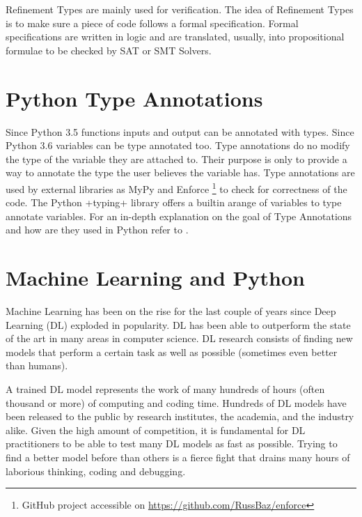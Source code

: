 Refinement Types \autocite{rushby_subtypes_1998} are mainly used for
verification. The idea of Refinement Types is to make sure a piece of
code follows a formal specification. Formal specifications are written
in logic and are translated, usually, into propositional formulae to be
checked by SAT or SMT Solvers.

\section{Python Type Annotations}\label{python-type-annotations}

Since Python 3.5 \autocite{pep484} functions inputs and output can be
annotated with types. Since Python 3.6 \autocite{pep526} variables can
be type annotated too. Type annotations do no modify the type of the
variable they are attached to. Their purpose is only to provide a way to
annotate the type the user believes the variable has. Type annotations
are used by external libraries as MyPy \autocite{lehtosalo2016mypy} and
Enforce \footnote{GitHub project accessible on
  \url{https://github.com/RussBaz/enforce}} to check for correctness of
the code. The Python \pycode+typing+ library offers a builtin arange of
variables to type annotate variables. For an in-depth explanation on the
goal of Type Annotations and how are they used in Python refer to
\autocite{pep483}.

\section{Machine Learning and Python}%
\label{machine-learning-and-python}

Machine Learning has been on the rise for the last couple of years since
Deep Learning (DL) exploded in popularity. DL has been able to
outperform the state of the art in many areas in computer science. DL
research consists of finding new models that perform a certain task as
well as possible (sometimes even better than humans).

A trained DL model represents the work of many hundreds of hours (often
thousand or more) of computing and coding time. Hundreds of DL models
have been released to the public by research institutes, the academia,
and the industry alike. Given the high amount of competition, it is
fundamental for DL practitioners to be able to test many DL models as
fast as possible. Trying to find a better model before than others is a
fierce fight that drains many hours of laborious thinking, coding and
debugging.

